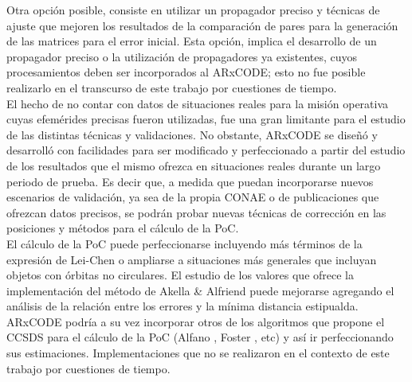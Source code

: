 Otra opci\'on posible, consiste en utilizar un propagador preciso y t\'ecnicas de ajuste que mejoren los resultados de la comparaci\'on de pares para la generaci\'on de las matrices para el error inicial. Esta opci\'on, implica el desarrollo de un propagador preciso o la utilizaci\'on de propagadores ya existentes, cuyos procesamientos deben ser incorporados al ARxCODE; esto no fue posible realizarlo en el transcurso de este trabajo por cuestiones de tiempo.\\

El hecho de no contar con datos de situaciones reales para la misi\'on operativa cuyas efem\'erides precisas fueron utilizadas, fue una gran limitante para  el estudio de las distintas t\'ecnicas y validaciones. No obstante, ARxCODE se dise\~n\'o y desarroll\'o con facilidades para ser modificado y perfeccionado a partir del estudio de los resultados que el mismo ofrezca en situaciones reales durante un largo periodo de prueba. Es decir que, a medida que puedan incorporarse nuevos escenarios de validaci\'on, ya sea de la propia CONAE o de publicaciones que ofrezcan datos precisos, se podr\'an probar nuevas t\'ecnicas de correcci\'on en las posiciones y m\'etodos para el c\'alculo de la PoC.\\

El c\'alculo de la PoC puede perfeccionarse incluyendo m\'as t\'erminos de la expresi\'on de Lei-Chen \citep{leichen} o ampliarse a situaciones m\'as generales que incluyan objetos con \'orbitas no circulares. El estudio de los valores que ofrece la implementaci\'on del m\'etodo de Akella \& Alfriend puede mejorarse agregando el an\'alisis de la relaci\'on entre los errores y la m\'inima distancia estipualda. ARxCODE podr\'ia a su vez incorporar otros de los algoritmos que propone el CCSDS para el c\'alculo de la PoC (Alfano \citep{alfano2008method}, Foster \citep{foster}, etc) y as\'i ir perfeccionando sus estimaciones. Implementaciones que no se realizaron en el contexto de este trabajo por cuestiones de tiempo.\\


\endinput